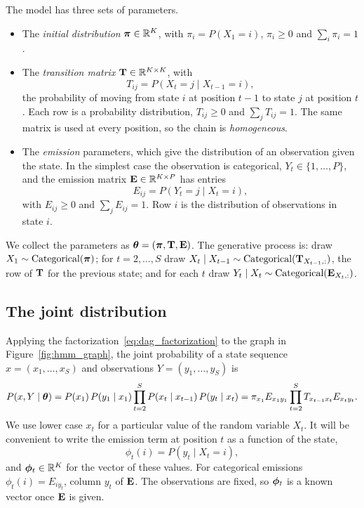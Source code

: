 The model has three sets of parameters.
\begin{itemize}
  \item The \emph{initial distribution} $\boldsymbol{\pi}\in\mathbb{R}^K$, with $\pi_i=P(X_1=i)$, $\pi_i\geq 0$ and $\sum_i\pi_i=1$.
  \item The \emph{transition matrix} $\mathbf{T}\in\mathbb{R}^{K\times K}$, with
  \begin{equation}
    T_{ij} = P(X_t=j\mid X_{t-1}=i),
  \end{equation}
  the probability of moving from state $i$ at position $t-1$ to state $j$ at position $t$. Each row is a probability distribution, $T_{ij}\geq 0$ and $\sum_j T_{ij}=1$. The same matrix is used at every position, so the chain is \emph{homogeneous}.
  \item The \emph{emission} parameters, which give the distribution of an observation given the state. In the simplest case the observation is categorical, $Y_t\in\{1,\dots,P\}$, and the emission matrix $\mathbf{E}\in\mathbb{R}^{K\times P}$ has entries
  \begin{equation}
    E_{ij} = P(Y_t=j\mid X_t=i),
  \end{equation}
  with $E_{ij}\geq 0$ and $\sum_j E_{ij}=1$. Row $i$ is the distribution of observations in state $i$.
\end{itemize}
We collect the parameters as $\boldsymbol{\theta}=(\boldsymbol{\pi},\mathbf{T},\mathbf{E})$. The generative process is: draw $X_1\sim\text{Categorical}(\boldsymbol{\pi})$; for $t=2,\dots,S$ draw $X_t\mid X_{t-1}\sim\text{Categorical}(\mathbf{T}_{X_{t-1},:})$, the row of $\mathbf{T}$ for the previous state; and for each $t$ draw $Y_t\mid X_t\sim\text{Categorical}(\mathbf{E}_{X_t,:})$.

\subsection{The joint distribution}

Applying the factorization~\eqref{eq:dag_factorization} to the graph in Figure~\ref{fig:hmm_graph}, the joint probability of a state sequence $x=(x_1,\dots,x_S)$ and observations $Y=(y_1,\dots,y_S)$ is
\begin{equation}
  P(x,Y\mid\boldsymbol{\theta}) = P(x_1)\,P(y_1\mid x_1)\prod_{t=2}^S P(x_t\mid x_{t-1})\,P(y_t\mid x_t)
  = \pi_{x_1}E_{x_1y_1}\prod_{t=2}^S T_{x_{t-1}x_t}E_{x_ty_t}.
  \label{eq:hmm_joint}
\end{equation}
We use lower case $x_t$ for a particular value of the random variable $X_t$. It will be convenient to write the emission term at position $t$ as a function of the state,
\begin{equation}
  \phi_t(i) = P(y_t\mid X_t=i),
\end{equation}
and $\boldsymbol{\phi}_t\in\mathbb{R}^K$ for the vector of these values. For categorical emissions $\phi_t(i)=E_{iy_t}$, column $y_t$ of $\mathbf{E}$. The observations are fixed, so $\boldsymbol{\phi}_t$ is a known vector once $\mathbf{E}$ is given.

